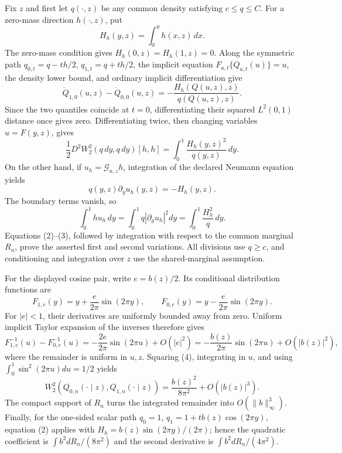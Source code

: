 Fix \(z\) and first let \(q(\cdot,z)\) be any common density satisfying \(c\le q\le C\).  For a zero-mass direction \(h(\cdot,z)\), put
\[
 H_h(y,z)=\int_0^y h(x,z)\,dx .
\]
The zero-mass condition gives \(H_h(0,z)=H_h(1,z)=0\).  Along the symmetric path \(q_{0,t}=q-th/2\), \(q_{1,t}=q+th/2\), the implicit equation \(F_{a,t}\{Q_{a,t}(u)\}=u\), the density lower bound, and ordinary implicit differentiation give
\[
 \dot Q_{1,0}(u,z)-\dot Q_{0,0}(u,z)
 =-\frac{H_h(Q(u,z),z)}{q(Q(u,z),z)}.                 \tag{1}
\]
Since the two quantiles coincide at \(t=0\), differentiating their squared \(L^2(0,1)\) distance once gives zero.  Differentiating twice, then changing variables \(u=F(y,z)\), gives
\[
 \frac12D^2W_2^2(q\,dy,q\,dy)[h,h]
 =\int_0^1\frac{H_h(y,z)^2}{q(y,z)}\,dy.              \tag{2}
\]
On the other hand, if \(u_h=\mathcal G_{n,z}h\), integration of the declared Neumann equation yields
\[
 q(y,z)\partial_yu_h(y,z)=-H_h(y,z).
\]
The boundary terms vanish, so
\[
 \int_0^1h u_h\,dy
 =\int_0^1q|\partial_yu_h|^2dy
 =\int_0^1\frac{H_h^2}{q}\,dy.                        \tag{3}
\]
Equations (2)--(3), followed by integration with respect to the common marginal \(R_n\), prove the asserted first and second variations.  All divisions use \(q\ge c\), and conditioning and integration over \(z\) use the shared-marginal assumption.

For the displayed cosine pair, write \(e=b(z)/2\).  Its conditional distribution functions are
\[
 F_{1,e}(y)=y+\frac{e}{2\pi}\sin(2\pi y),\qquad
 F_{0,e}(y)=y-\frac{e}{2\pi}\sin(2\pi y).
\]
For \(|e|<1\), their derivatives are uniformly bounded away from zero.  Uniform implicit Taylor expansion of the inverses therefore gives
\[
 F_{1,e}^{-1}(u)-F_{0,e}^{-1}(u)
 =-\frac{2e}{2\pi}\sin(2\pi u)+O(|e|^2)
 =-\frac{b(z)}{2\pi}\sin(2\pi u)+O(|b(z)|^2),         \tag{4}
\]
where the remainder is uniform in \(u,z\).  Squaring (4), integrating in \(u\), and using \(\int_0^1\sin^2(2\pi u)du=1/2\) yields
\[
 W_2^2(Q_{0,n}(\cdot\mid z),Q_{1,n}(\cdot\mid z))
 =\frac{b(z)^2}{8\pi^2}+O(|b(z)|^3).                  \tag{5}
\]
The compact support of \(R_n\) turns the integrated remainder into \(O(\|b\|_\infty^3)\).  Finally, for the one-sided scalar path \(q_0=1\), \(q_1=1+t b(z)\cos(2\pi y)\), equation (2) applies with \(H_h=b(z)\sin(2\pi y)/(2\pi)\); hence the quadratic coefficient is \(\int b^2dR_n/(8\pi^2)\) and the second derivative is \(\int b^2dR_n/(4\pi^2)\).